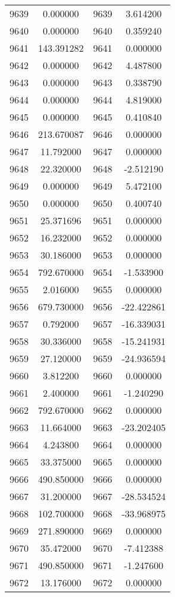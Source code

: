 \documentclass[12pt]{article}
\begin{document}
\begin{longtable}{@{}cccc@{}}
9639 & 0.000000 & 9639 & 3.614200 \\
9640 & 0.000000 & 9640 & 0.359240 \\
9641 & 143.391282 & 9641 & 0.000000 \\
9642 & 0.000000 & 9642 & 4.487800 \\
9643 & 0.000000 & 9643 & 0.338790 \\
9644 & 0.000000 & 9644 & 4.819000 \\
9645 & 0.000000 & 9645 & 0.410840 \\
9646 & 213.670087 & 9646 & 0.000000 \\
9647 & 11.792000 & 9647 & 0.000000 \\
9648 & 22.320000 & 9648 & -2.512190 \\
9649 & 0.000000 & 9649 & 5.472100 \\
9650 & 0.000000 & 9650 & 0.400740 \\
9651 & 25.371696 & 9651 & 0.000000 \\
9652 & 16.232000 & 9652 & 0.000000 \\
9653 & 30.186000 & 9653 & 0.000000 \\
9654 & 792.670000 & 9654 & -1.533900 \\
9655 & 2.016000 & 9655 & 0.000000 \\
9656 & 679.730000 & 9656 & -22.422861 \\
9657 & 0.792000 & 9657 & -16.339031 \\
9658 & 30.336000 & 9658 & -15.241931 \\
9659 & 27.120000 & 9659 & -24.936594 \\
9660 & 3.812200 & 9660 & 0.000000 \\
9661 & 2.400000 & 9661 & -1.240290 \\
9662 & 792.670000 & 9662 & 0.000000 \\
9663 & 11.664000 & 9663 & -23.202405 \\
9664 & 4.243800 & 9664 & 0.000000 \\
9665 & 33.375000 & 9665 & 0.000000 \\
9666 & 490.850000 & 9666 & 0.000000 \\
9667 & 31.200000 & 9667 & -28.534524 \\
9668 & 102.700000 & 9668 & -33.968975 \\
9669 & 271.890000 & 9669 & 0.000000 \\
9670 & 35.472000 & 9670 & -7.412388 \\
9671 & 490.850000 & 9671 & -1.247600 \\
9672 & 13.176000 & 9672 & 0.000000 \\

\end{longtable}
\end{document}
